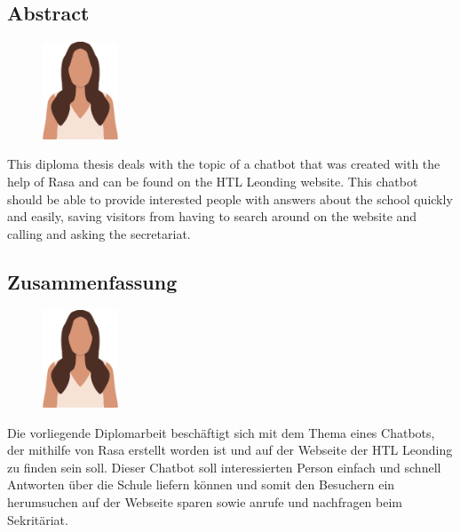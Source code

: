 \begin{spacing}{1}
    \chapter*{Abstract}
\end{spacing}
\begin{figure}
    \begin{center}
      \includegraphics[width=0.2\textwidth]{pics/LeonieTrans.png}
    \end{center}
\end{figure}
This diploma thesis deals with the topic of a chatbot that was created with the help of Rasa and can be found on the HTL Leonding website. This chatbot should be able to provide interested people with answers about the school quickly and easily, saving visitors from having to search around on the website and calling and asking the secretariat.

\newpage
\begin{spacing}{1}
    \chapter*{Zusammenfassung}
\end{spacing}
\begin{figure}
    \begin{center}
      \includegraphics[width=0.2\textwidth]{pics/LeonieTrans.png}
    \end{center}
\end{figure}
Die vorliegende Diplomarbeit beschäftigt sich mit dem Thema eines Chatbots, der mithilfe von Rasa erstellt worden ist und auf der Webseite der HTL Leonding zu finden sein soll. Dieser Chatbot soll interessierten Person einfach und schnell Antworten über die Schule liefern können und somit den Besuchern ein herumsuchen auf der Webseite sparen sowie anrufe und nachfragen beim Sekritäriat.
